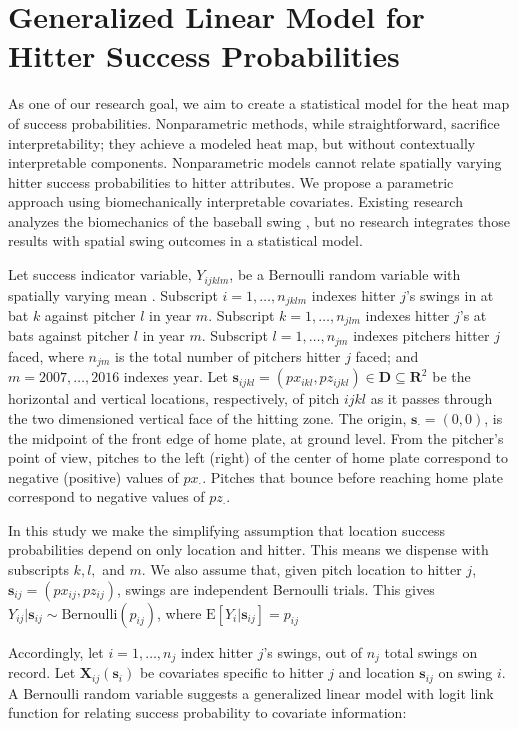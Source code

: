 \section{Generalized Linear Model for Hitter Success Probabilities} %

As one of our research goal, we aim to create a statistical model for the heat map of success probabilities. Nonparametric methods, while straightforward, sacrifice interpretability; they achieve a modeled heat map, but without contextually interpretable components. Nonparametric models cannot relate spatially varying hitter success probabilities to hitter attributes. We propose a parametric approach using biomechanically interpretable covariates. Existing research analyzes the biomechanics of the baseball swing \citep{Welch1995}, but no research integrates those results with spatial swing outcomes in a statistical model.

Let success indicator variable, $Y_{ijklm}$, be a Bernoulli random variable with spatially varying mean \citep{Ross2002}. Subscript $i = 1, \dots, n_{jklm}$ indexes hitter $j$'s swings in at bat $k$ against pitcher $l$ in year $m$. Subscript $k = 1, \dots, n_{jlm}$ indexes hitter $j$'s at bats against pitcher $l$ in year $m$. Subscript $l = 1, \dots, n_{jm}$ indexes pitchers hitter $j$ faced, where $n_{jm}$ is the total number of pitchers hitter $j$ faced; and $m = 2007, \dots, 2016$ indexes year. Let $\pmb{s}_{ijkl} = (px_{ikl}, pz_{ijkl})\in \pmb{D} \subseteq \pmb{R}^{2}$ be the horizontal and vertical locations, respectively, of pitch $ijkl$ as it passes through the two dimensioned vertical face of the hitting zone. The origin, $\pmb{s}_{\cdot} = (0,0)$, is the midpoint of the front edge of home plate, at ground level. From the pitcher's point of view, pitches to the left (right) of the center of home plate correspond to negative (positive) values of $px_{\cdot}$. Pitches that bounce before reaching home plate correspond to negative values of $pz_{\cdot}$.  

In this study we make the simplifying assumption that location success probabilities depend on only location and hitter. This means we dispense with subscripts $k, l,$ and $m$. We also assume that, given pitch location to hitter $j$, $\pmb{s}_{ij} = (px_{ij}, pz_{ij})$,  swings are independent Bernoulli trials. This gives $Y_{ij}|\pmb{s}_{ij} \sim \text{Bernoulli}(p_{ij})$, where $\text{E}[Y_{i}|\pmb{s}_{ij}] = p_{ij}$

Accordingly, let $i = 1, \dots, n_{j}$ index hitter $j$'s swings, out of $n_{j}$ total swings on record. Let $\pmb{X}_{ij}(\pmb{s}_{i})$ be covariates specific to hitter $j$ and location $\pmb{s}_{ij}$ on swing $i$. A Bernoulli random variable suggests a generalized linear model with logit link function for relating success probability to covariate information:

